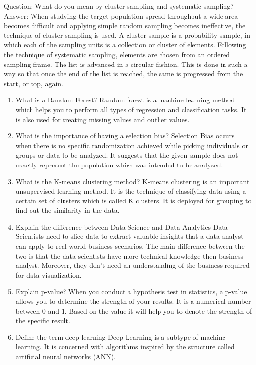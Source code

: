 \documentclass[
]{book}
\providecommand{\tightlist}{%
  \setlength{\itemsep}{0pt}\setlength{\parskip}{0pt}}
\begin{document}
Question: What do you mean by cluster sampling and systematic sampling?
Answer: When studying the target population spread throughout a wide area becomes difficult and applying simple random sampling becomes ineffective, the technique of cluster sampling is used. A cluster sample is a probability sample, in which each of the sampling units is a collection or cluster of elements.
Following the technique of systematic sampling, elements are chosen from an ordered sampling frame. The list is advanced in a circular fashion. This is done in such a way so that once the end of the list is reached, the same is progressed from the start, or top, again.

\begin{enumerate}
\def\labelenumi{\arabic{enumi}.}
\setcounter{enumi}{22}
\tightlist
\item
  What is a Random Forest?
  Random forest is a machine learning method which helps you to perform all types of regression and classification tasks. It is also used for treating missing values and outlier values.
\item
  What is the importance of having a selection bias?
  Selection Bias occurs when there is no specific randomization achieved while picking individuals or groups or data to be analyzed. It suggests that the given sample does not exactly represent the population which was intended to be analyzed.
\item
  What is the K-means clustering method?
  K-means clustering is an important unsupervised learning method. It is the technique of classifying data using a certain set of clusters which is called K clusters. It is deployed for grouping to find out the similarity in the data.
\item
  Explain the difference between Data Science and Data Analytics
  Data Scientists need to slice data to extract valuable insights that a data analyst can apply to real-world business scenarios. The main difference between the two is that the data scientists have more technical knowledge then business analyst. Moreover, they don't need an understanding of the business required for data visualization.
\item
  Explain p-value?
  When you conduct a hypothesis test in statistics, a p-value allows you to determine the strength of your results. It is a numerical number between 0 and 1. Based on the value it will help you to denote the strength of the specific result.
\item
  Define the term deep learning
  Deep Learning is a subtype of machine learning. It is concerned with algorithms inspired by the structure called artificial neural networks (ANN).

\end{enumerate}
\end{document}
